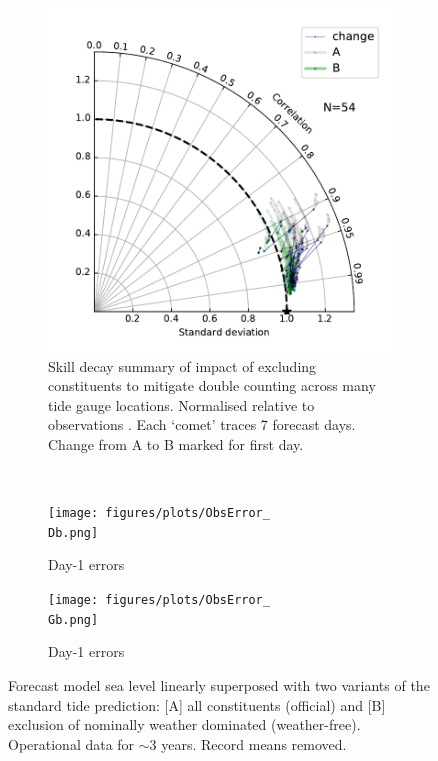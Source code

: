 \begin{figure}[H]\centering
    \begin{subfigure}[b]{\figwidthBig}
        \includegraphics[width=\textwidth]{figures/plots/taylorDoubleCount.pdf}
        \caption{Skill decay summary of impact of excluding constituents to mitigate double counting across many tide gauge locations. Normalised relative to observations \citep{Taylor:2000wp}. Each `comet' traces 7 forecast days.  Change from A to B marked for first day.}   
    \end{subfigure}
    \\
    \begin{subfigure}[b]{\figwidthHalf}
        \texttt{[image: figures/plots/ObsError\_\\Db.png]}
        \caption{Day-1 errors \Dname{}}
    \end{subfigure}
    \begin{subfigure}[b]{\figwidthHalf}
        \texttt{[image: figures/plots/ObsError\_\\Gb.png]}
        \caption{Day-1 errors \Gname{}}
    \end{subfigure}
    
    \caption{Forecast model sea level linearly superposed with two variants of the standard tide prediction: [A] all constituents (official) and [B] exclusion of nominally weather dominated (weather-free).  Operational data for $\sim3$ years. Record means removed.} 
    \label{fig:aggStats}
\end{figure}   


